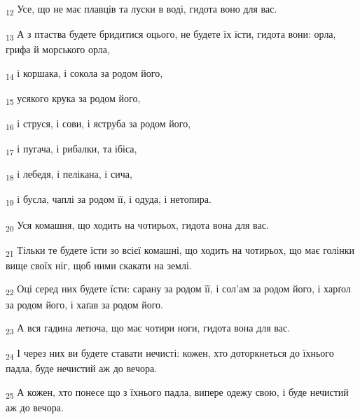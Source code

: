 \begin{tcolorbox}
\textsubscript{12} Усе, що не має плавців та луски в воді, гидота воно для вас.
\end{tcolorbox}
\begin{tcolorbox}
\textsubscript{13} А з птаства будете бридитися оцього, не будете їх їсти, гидота вони: орла, грифа й морського орла,
\end{tcolorbox}
\begin{tcolorbox}
\textsubscript{14} і коршака, і сокола за родом його,
\end{tcolorbox}
\begin{tcolorbox}
\textsubscript{15} усякого крука за родом його,
\end{tcolorbox}
\begin{tcolorbox}
\textsubscript{16} і струся, і сови, і яструба за родом його,
\end{tcolorbox}
\begin{tcolorbox}
\textsubscript{17} і пугача, і рибалки, та ібіса,
\end{tcolorbox}
\begin{tcolorbox}
\textsubscript{18} і лебедя, і пелікана, і сича,
\end{tcolorbox}
\begin{tcolorbox}
\textsubscript{19} і бусла, чаплі за родом її, і одуда, і нетопира.
\end{tcolorbox}
\begin{tcolorbox}
\textsubscript{20} Уся комашня, що ходить на чотирьох, гидота вона для вас.
\end{tcolorbox}
\begin{tcolorbox}
\textsubscript{21} Тільки те будете їсти зо всієї комашні, що ходить на чотирьох, що має голінки вище своїх ніг, щоб ними скакати на землі.
\end{tcolorbox}
\begin{tcolorbox}
\textsubscript{22} Оці серед них будете їсти: сарану за родом її, і сол'ам за родом його, і харґол за родом його, і хаґав за родом його.
\end{tcolorbox}
\begin{tcolorbox}
\textsubscript{23} А вся гадина летюча, що має чотири ноги, гидота вона для вас.
\end{tcolorbox}
\begin{tcolorbox}
\textsubscript{24} І через них ви будете ставати нечисті: кожен, хто доторкнеться до їхнього падла, буде нечистий аж до вечора.
\end{tcolorbox}
\begin{tcolorbox}
\textsubscript{25} А кожен, хто понесе що з їхнього падла, випере одежу свою, і буде нечистий аж до вечора.
\end{tcolorbox}

